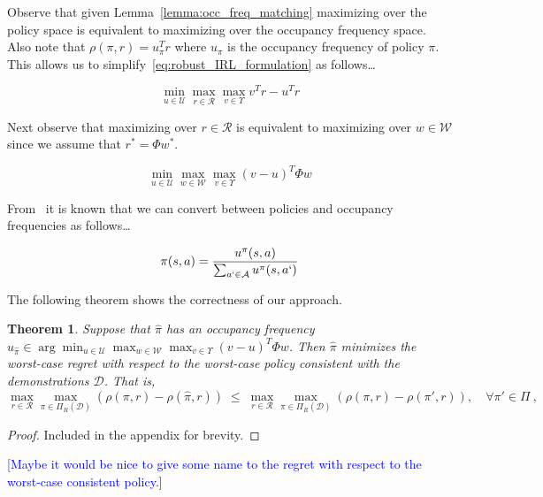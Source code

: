 \documentclass[11pt]{article}
\newtheorem{theorem}{Theorem}
\newcommand{\mm}[1]{\textcolor{blue}{[#1]}}
\begin{document}
Observe that given Lemma~\ref{lemma:occ_freq_matching} maximizing over the policy space is equivalent to maximizing over the occupancy frequency space.
Also note that $\rho(\pi,r) = u_{\pi}^T r$ where $u_{\pi}$ is the occupancy frequency of policy $\pi$. This allows us to simplify~\eqref{eq:robust_IRL_formulation} as follows\dots

\begin{equation}
	\min_{u \in \mathcal{U}} \max_{r \in \mathcal{R}} \max_{v \in \Upsilon} v^T r - u^T r
\end{equation}

Next observe that maximizing over $r \in \mathcal{R}$ is equivalent to maximizing over $w \in \mathcal{W}$ since we assume that $r^* = \Phi w^*$.

\begin{equation}\label{eq:primal-robust-irl}
	\min_{u \in \mathcal{U}} \max_{w \in \mathcal{W}} \max_{v \in \Upsilon} (v - u)^T \Phi w
\end{equation}

From~\cite{Puterman1994} it is known that we can convert between policies and occupancy frequencies as follows\dots

\begin{equation}\label{eq:policy-construction}
	\pi(s, a) = \frac{u^{\pi}(s,a)}{\sum_{a` \in \mathcal{A}} u^{\pi}(s,a`)}
\end{equation}

The following theorem shows the correctness of our approach.

\begin{theorem}\label{thrm:chebeyshev-regret}
	Suppose that $\hat{\pi}$ has an occupancy frequency $u_{\hat{\pi}} \in \arg\min_{u \in \mathcal{U}} \max_{w \in \mathcal{W}} \max_{v \in \Upsilon} (v - u)^T \Phi w$.
	Then $\hat{\pi}$ minimizes the worst-case regret with respect to the worst-case
	policy consistent with the demonstrations $\mathcal{D}$. That is,
	\[
		\max_{r\in \mathcal{R}} \max_{\pi \in \Pi_{R}(\mathcal{D})} \left(\rho(\pi, r) - \rho(\hat{\pi}, r)\right)
		\; \le\;
		\max_{r\in \mathcal{R}} \max_{\pi \in \Pi_{R}(\mathcal{D})} \left(\rho(\pi, r) - \rho(\pi', r)\right), \quad  \forall \pi' \in \Pi~,
	\]
\end{theorem}

\begin{proof}
	Included in the appendix for brevity.
\end{proof}

\mm{Maybe it would be nice to give some name to the regret with respect to the worst-case consistent policy.}
\end{document}
